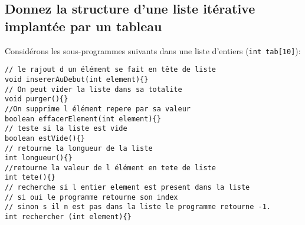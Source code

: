 \documentclass[french]{article}
\begin{document}
	\subsection{Donnez la structure d’une liste itérative implantée par un tableau}
	Considérons les sous-programmes suivants dans une liste d’entiers (\texttt{int tab[10]}):
\begin{lstlisting}[caption={Liste des opérations dans une liste d’entiers}]
// le rajout d un élément se fait en tête de liste
void insererAuDebut(int element){} 
// On peut vider la liste dans sa totalite
void purger(){} 
//On supprime l élément repere par sa valeur
boolean effacerElement(int element){}
// teste si la liste est vide
boolean estVide(){} 
// retourne la longueur de la liste
int longueur(){}
//retourne la valeur de l élément en tete de liste
int tete(){}
// recherche si l entier element est present dans la liste 
// si oui le programme retourne son index 
// sinon s il n est pas dans la liste le programme retourne -1.
int rechercher (int element){}  
\end{lstlisting}
	
	
\end{document}
